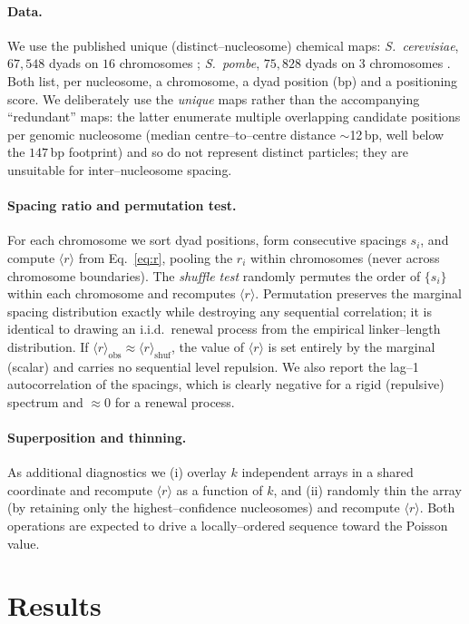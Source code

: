 \documentclass[11pt]{article}
\renewcommand{\r}{\langle r\rangle}
\begin{document}
\paragraph{Data.} We use the published unique (distinct--nucleosome) chemical
maps: \textit{S.\ cerevisiae}, $67{,}548$ dyads on $16$ chromosomes
\citep{brogaard2012}; \textit{S.\ pombe}, $75{,}828$ dyads on $3$ chromosomes
\citep{moyle2013}. Both list, per nucleosome, a chromosome, a dyad position
(bp) and a positioning score. We deliberately use the \emph{unique} maps rather
than the accompanying ``redundant'' maps: the latter enumerate multiple
overlapping candidate positions per genomic nucleosome (median centre--to--centre
distance $\sim$12\,bp, well below the $147$\,bp footprint) and so do not
represent distinct particles; they are unsuitable for inter--nucleosome spacing.

\paragraph{Spacing ratio and permutation test.} For each chromosome we sort
dyad positions, form consecutive spacings $s_i$, and compute $\r$ from
Eq.~\eqref{eq:r}, pooling the $r_i$ within chromosomes (never across chromosome
boundaries). The \emph{shuffle test} randomly permutes the order of $\{s_i\}$
within each chromosome and recomputes $\r$. Permutation preserves the marginal
spacing distribution exactly while destroying any sequential correlation; it is
identical to drawing an i.i.d.\ renewal process from the empirical
linker--length distribution. If $\r_{\mathrm{obs}}\approx\r_{\mathrm{shuf}}$, the
value of $\r$ is set entirely by the marginal (scalar) and carries no sequential
level repulsion. We also report the lag--1 autocorrelation of the spacings,
which is clearly negative for a rigid (repulsive) spectrum and $\approx0$ for a
renewal process.

\paragraph{Superposition and thinning.} As additional diagnostics we (i)
overlay $k$ independent arrays in a shared coordinate and recompute $\r$ as a
function of $k$, and (ii) randomly thin the array (by retaining only the
highest--confidence nucleosomes) and recompute $\r$. Both operations are
expected to drive a locally--ordered sequence toward the Poisson value.

\section{Results}
\end{document}
